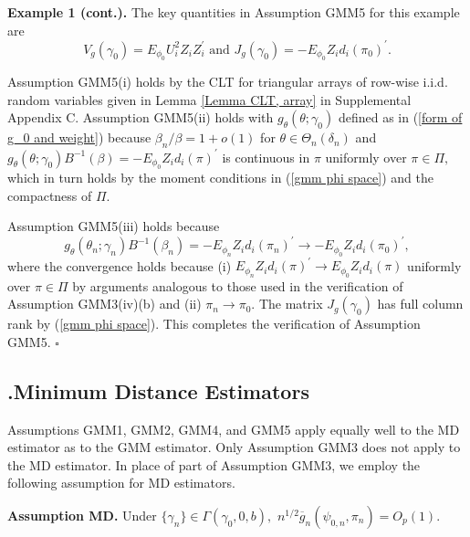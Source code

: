 \documentclass[12pt,thmsb,titlepage,final,oneside,letterpaper]{article}
\begin{document}
\noindent \textbf{Example 1 (cont.). }The key quantities in Assumption GMM5
for this example are%
\begin{equation}
V_{g}(\gamma _{0})=E_{\phi _{0}}U_{i}^{2}Z_{i}Z_{i}^{\prime }\text{ and }%
J_{g}(\gamma _{0})=-E_{\phi _{0}}Z_{i}d_{i}(\pi _{0})^{\prime }.
\label{GMM C5 -1}
\end{equation}

Assumption GMM5(i) holds by the CLT for triangular arrays of row-wise i.i.d.
random variables given in Lemma \ref{Lemma CLT, array} in Supplemental
Appendix C. Assumption GMM5(ii) holds with $g_{\theta }(\theta ;\gamma _{0})$
defined as in (\ref{form of g_0 and weight}) because $\beta _{n}/\beta
=1+o(1)$ for $\theta \in \Theta _{n}(\delta _{n})$ and $g_{\theta }(\theta
;\gamma _{0})B^{-1}(\beta )=-E_{\phi _{0}}Z_{i}d_{i}(\pi )^{\prime }$ is
continuous in $\pi $ uniformly over $\pi \in \Pi ,$ which in turn holds by
the moment conditions in (\ref{gmm phi space}) and the compactness of $\Pi .$

Assumption GMM5(iii) holds because 
\begin{equation}
g_{\theta }(\theta _{n};\gamma _{n})B^{-1}(\beta _{n})=-E_{\phi
_{n}}Z_{i}d_{i}(\pi _{n})^{\prime }\rightarrow -E_{\phi _{0}}Z_{i}d_{i}(\pi
_{0})^{\prime },
\end{equation}%
where the convergence holds because (i) $E_{\phi _{n}}Z_{i}d_{i}(\pi
)^{\prime }\rightarrow E_{\phi _{0}}Z_{i}d_{i}(\pi )$ uniformly over $\pi
\in \Pi $ by arguments analogous to those used in the verification of
Assumption GMM3(iv)(b) and (ii) $\pi _{n}\rightarrow \pi _{0}.$ The matrix $%
J_{g}(\gamma _{0})$ has full column rank by (\ref{gmm phi space}). This
completes the verification of Assumption GMM5. $\square $

\subsection{\hspace{-0.23in}\textbf{.}\hspace{0.18in}Minimum Distance
Estimators}

\hspace{0.25in}Assumptions GMM1, GMM2, GMM4, and GMM5 apply equally well to
the MD estimator as to the GMM estimator. Only Assumption GMM3 does not
apply to the MD estimator. In place of part of Assumption GMM3, we employ
the following assumption for MD estimators.\medskip

\noindent \textbf{Assumption MD. }Under $\{\gamma _{n}\}\in \Gamma (\gamma
_{0},0,b),$ $n^{1/2}\overline{g}_{n}(\psi _{0,n},\pi _{n})=O_{p}(1).$\medskip
\end{document}

